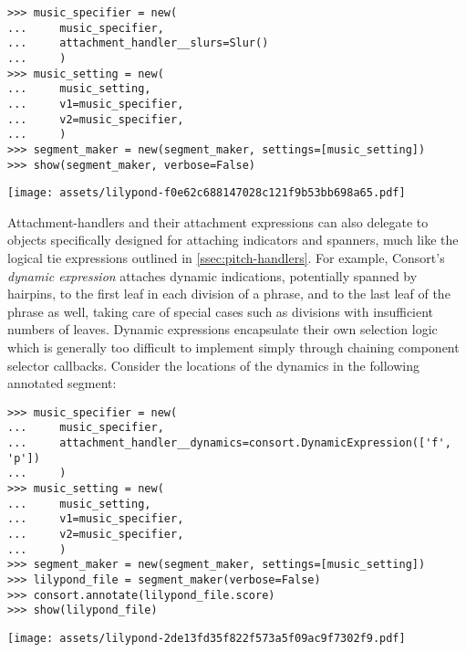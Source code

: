 \begin{abjadbookoutput}
\begin{singlespacing}
\vspace{-0.5\baselineskip}
\begin{lstlisting}
>>> music_specifier = new(
...     music_specifier,
...     attachment_handler__slurs=Slur()
...     )
>>> music_setting = new(
...     music_setting,
...     v1=music_specifier,
...     v2=music_specifier,
...     )
>>> segment_maker = new(segment_maker, settings=[music_setting])
>>> show(segment_maker, verbose=False)
\end{lstlisting}
\noindent\texttt{[image: assets/lilypond-f0e62c688147028c121f9b53bb698a65.pdf]}
\end{singlespacing}
\end{abjadbookoutput}

\noindent Attachment-handlers and their attachment expressions can also
delegate to objects specifically designed for attaching indicators and
spanners, much like the logical tie expressions outlined in
\autoref{ssec:pitch-handlers}. For example, Consort's \emph{dynamic expression}
attaches dynamic indications, potentially spanned by hairpins, to the first
leaf in each division of a phrase, and to the last leaf of the phrase as well,
taking care of special cases such as divisions with insufficient numbers of
leaves. Dynamic expressions encapsulate their own selection logic which is
generally too difficult to implement simply through chaining component selector
callbacks. Consider the locations of the dynamics in the following annotated
segment:

\begin{comment}
<abjad>[stylesheet=../consort.ily]
music_specifier = new(
    music_specifier,
    attachment_handler__dynamics=consort.DynamicExpression(['f', 'p'])
    )
music_setting = new(
    music_setting,
    v1=music_specifier,
    v2=music_specifier,
    )
segment_maker = new(segment_maker, settings=[music_setting])
lilypond_file = segment_maker(verbose=False)
consort.annotate(lilypond_file.score)
show(lilypond_file)
</abjad>
\end{comment}

\begin{abjadbookoutput}
\begin{singlespacing}
\vspace{-0.5\baselineskip}
\begin{lstlisting}
>>> music_specifier = new(
...     music_specifier,
...     attachment_handler__dynamics=consort.DynamicExpression(['f', 'p'])
...     )
>>> music_setting = new(
...     music_setting,
...     v1=music_specifier,
...     v2=music_specifier,
...     )
>>> segment_maker = new(segment_maker, settings=[music_setting])
>>> lilypond_file = segment_maker(verbose=False)
>>> consort.annotate(lilypond_file.score)
>>> show(lilypond_file)
\end{lstlisting}
\noindent\texttt{[image: assets/lilypond-2de13fd35f822f573a5f09ac9f7302f9.pdf]}
\end{singlespacing}
\end{abjadbookoutput}

